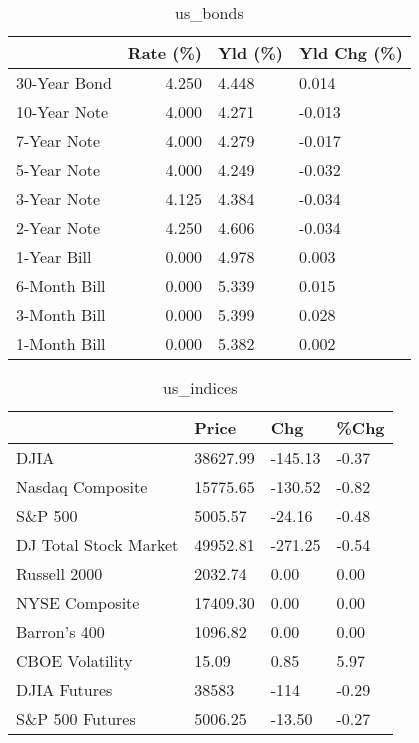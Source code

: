 \documentclass{article}%
\begin{document}
%


\begin{table}[htbp]%
\caption{us\_bonds}%
\centering%
\begin{adjustbox}{width=1\textwidth}%
\begin{tabular}{lrll}
\toprule
             &  Rate (\%) & Yld (\%) & Yld Chg (\%) \\
\midrule
30-Year Bond &     4.250 &   4.448 &       0.014 \\
10-Year Note &     4.000 &   4.271 &      -0.013 \\
 7-Year Note &     4.000 &   4.279 &      -0.017 \\
 5-Year Note &     4.000 &   4.249 &      -0.032 \\
 3-Year Note &     4.125 &   4.384 &      -0.034 \\
 2-Year Note &     4.250 &   4.606 &      -0.034 \\
 1-Year Bill &     0.000 &   4.978 &       0.003 \\
6-Month Bill &     0.000 &   5.339 &       0.015 \\
3-Month Bill &     0.000 &   5.399 &       0.028 \\
1-Month Bill &     0.000 &   5.382 &       0.002 \\
\bottomrule
\end{tabular}
%
\end{adjustbox}%
\end{table}

%


\begin{table}[htbp]%
\caption{us\_indices}%
\centering%
\begin{adjustbox}{width=1\textwidth}%
\begin{tabular}{llll}
\toprule
                      &    Price &     Chg &  \%Chg \\
\midrule
                 DJIA & 38627.99 & -145.13 & -0.37 \\
     Nasdaq Composite & 15775.65 & -130.52 & -0.82 \\
              S\&P 500 &  5005.57 &  -24.16 & -0.48 \\
DJ Total Stock Market & 49952.81 & -271.25 & -0.54 \\
         Russell 2000 &  2032.74 &    0.00 &  0.00 \\
       NYSE Composite & 17409.30 &    0.00 &  0.00 \\
         Barron's 400 &  1096.82 &    0.00 &  0.00 \\
      CBOE Volatility &    15.09 &    0.85 &  5.97 \\
         DJIA Futures &    38583 &    -114 & -0.29 \\
      S\&P 500 Futures &  5006.25 &  -13.50 & -0.27 \\
\bottomrule
\end{tabular}
%
\end{adjustbox}%
\end{table}
\end{document}

